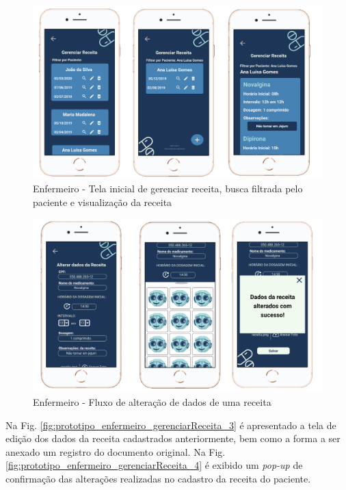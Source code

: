 \begin{figure}[H]
    \centering
    \includegraphics[width=15cm]{figuras/software/Atual_prototipo/Enfermeiro_gerenciarReceita_1.png}
    \caption{Enfermeiro - Tela inicial de gerenciar receita, busca filtrada pelo paciente e visualização da receita}
    \label{fig:prototipo_enfermeiro_gerenciarReceita_1}
\end{figure}

\begin{figure}[H]
    \centering
    \includegraphics[width=15cm]{figuras/software/Atual_prototipo/Enfermeiro_gerenciarReceita_2.png}
    \caption{Enfermeiro - Fluxo de alteração de dados de uma receita}
    \label{fig:prototipo_enfermeiro_gerenciarReceita_2}
\end{figure}

Na Fig. \ref{fig:prototipo_enfermeiro_gerenciarReceita_3} é apresentado a tela de edição dos dados da receita cadastrados anteriormente, bem como a forma a ser anexado um registro do documento original. Na Fig. \ref{fig:prototipo_enfermeiro_gerenciarReceita_4} é exibido um \textit{pop-up} de confirmação das alterações realizadas no cadastro da receita do paciente.

